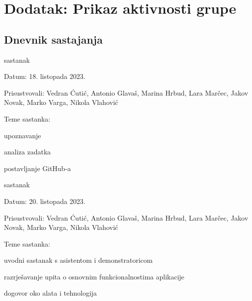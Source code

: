 \chapter*{Dodatak: Prikaz aktivnosti grupe}
		
		\section*{Dnevnik sastajanja}
		
%		
		
		\begin{packed_enum}
			\item  sastanak
			
			\item[] \begin{packed_item}
				\item Datum: 18. listopada 2023.
				\item Prisustvovali: Vedran Ćutić, Antonio Glavaš, Marina Hrbud, Lara Marčec, Jakov Novak, Marko Varga, Nikola Vlahović
				\item Teme sastanka:
				\begin{packed_item}
					\item  upoznavanje
					\item  analiza zadatka
					\item  postavljanje GitHub-a
				\end{packed_item}
			\end{packed_item}
			
			\item  sastanak
			\item[] \begin{packed_item}
				\item Datum: 20. listopada 2023.
				\item Prisustvovali: Vedran Ćutić, Antonio Glavaš, Marina Hrbud, Lara Marčec, Jakov Novak, Marko Varga, Nikola Vlahović
				\item Teme sastanka:
				\begin{packed_item}
					\item  uvodni sastanak s asistentom i demonstratoricom 
					\item  razrješavanje upita o osnovnim funkcionalnostima aplikacije
					\item  dogovor oko alata i tehnologija
				\end{packed_item}
			\end{packed_item}
			

\end{packed_enum}

